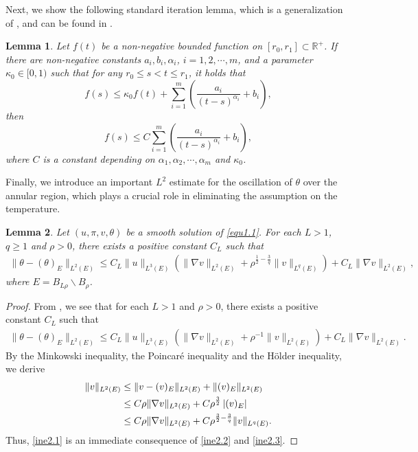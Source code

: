 \documentclass[11pt,reqno]{amsart}
\newtheorem{Lem}{Lemma}[section]
\numberwithin{Thm}{section}
\begin{document}
Next, we show the following standard iteration lemma, which is a generalization of \cite[Lemma 3.1]{Giaquinta}, and can be found in \cite[Lemma 2.1]{CL24}.
\begin{Lem}\label{Lem2.4}
Let $f(t)$ be a non-negative bounded function on $\left[r_0, r_1\right] \subset \mathbb{R}^{+}$. If there are non-negative constants $a_i, b_i,\alpha_i$, $i=1,2,\cdots,m$, and a parameter $\kappa_0 \in[0,1)$ such that for any $r_0 \leq s<t \leq r_1$, it holds that
$$
f(s) \leq \kappa_0 f(t)+\sum_{i=1}^m\left(\frac{a_i}{(t-s)^{\alpha_i}}+b_i\right),
$$
then
$$
f(s) \leq C\sum_{i=1}^m\left(\frac{a_i}{(t-s)^{\alpha_i}}+b_i\right),
$$
where $C$ is a constant depending on $\alpha_1,\alpha_2,\cdots,\alpha_m$ and $\kappa_0$.
\end{Lem}


Finally, we introduce an important $L^2$ estimate for the oscillation of $\theta$ over the annular region, which plays a crucial role in eliminating the assumption on the temperature.
\begin{Lem}\label{Lem2.5}
Let $(u,\pi,v,\theta)$ be a smooth solution of \eqref{equ1.1}. For each $L>1$, $q\geq1$ and $\rho>0$, there exists a positive constant $C_L$  such that
\begin{align}\label{ine2.1}
\|\theta - (\theta)_{E}\|_{L^2(E)} \leq C_L \|u\|_{L^3(E)} \left( \|\nabla v\|_{L^2(E)} + \rho^{\frac{1}{2}-\frac{3}{q}} \|v\|_{L^q(E)} \right) + C_L\|\nabla v\|_{L^2(E)},
\end{align}
where $E= B_{L\rho}\backslash B_\rho$.
\end{Lem}
\begin{proof}
From \cite[Proposition 3]{CY26}, we see that for each $L>1$ and $\rho>0$, there exists a positive constant $C_L$  such that
\begin{align}\label{ine2.2}
\|\theta - (\theta)_{E}\|_{L^2(E)} \leq C_L \|u\|_{L^3(E)} \left( \|\nabla v\|_{L^2(E)} + \rho^{-1} \|v\|_{L^2(E)} \right) + C_L\|\nabla v\|_{L^2(E)}.
\end{align}
By the Minkowski inequality, the Poincar\'{e} inequality and the H\"{o}lder inequality, we derive
	\begin{align}\label{ine2.3}
		\|v\|_{L^2(E)}&\leq \|v-(v)_E\|_{L^2(E)}+\|(v)_E\|_{L^2(E)}\notag\\
		&\leq C\rho\|\nabla v\|_{L^2 (E)}+C\rho^\frac{3}{2}\left|(v)_E\right|\\
		&\leq C\rho\|\nabla v\|_{L^2 (E)}+C\rho^{\frac{3}{2}-\frac{3}{q}}\|v\|_{L^q(E)}.\notag
	\end{align}
Thus, \eqref{ine2.1} is an immediate consequence of \eqref{ine2.2} and \eqref{ine2.3}.
\end{proof}
\end{document}
